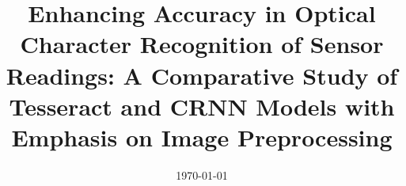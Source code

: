 \documentclass[a4paper, 11pt, oneside]{Thesis}  %
\begin{document}
\frontmatter      %

\title  {Enhancing Accuracy in Optical Character Recognition of Sensor Readings: A Comparative Study of Tesseract and CRNN Models with Emphasis on Image Preprocessing}

\addresses  {\groupname\\\deptname\\\univname}  %
\date       {\today}
\subject    {}
\keywords   {}

\maketitle


\fancyhead{}  %
\rhead{\thepage}  %
\lhead{}  %

\pagestyle{fancy}  %
\end{document}
